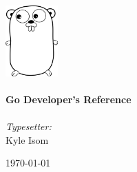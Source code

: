 \begin{titlepage}

\begin{center}


\includegraphics[width=0.15\textwidth]{./frontpage}\\[1cm]    


\HRule \\[0.4cm]
{ \huge \bfseries Go Developer's Reference}\\[0.4cm]

\HRule \\[1.5cm]

\emph{Typesetter:}\\Kyle Isom
\vfill

{\large \today}

\end{center}

\end{titlepage}
